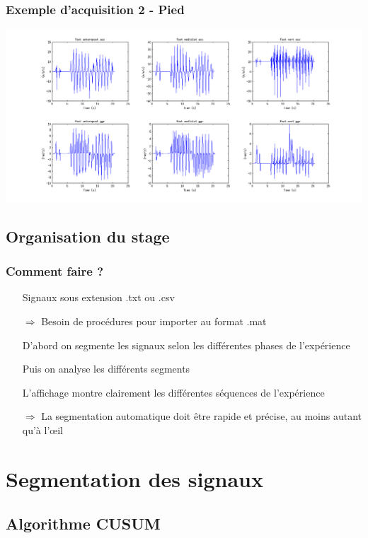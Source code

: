 \documentclass{beamer}
\begin{document}
\begin{frame}
	\frametitle{Exemple d'acquisition 2 - Pied}

			\hspace*{-2.75cm}\includegraphics[scale=0.4]{errorexamplevisufoot}

\end{frame}
\subsection{Organisation du stage}

\begin{frame}
	\frametitle{Comment faire ?}
	\begin{itemize}
		\item[Signaux] sous extension .txt ou .csv
		\item[$\Longrightarrow$] Besoin de procédures pour importer au format .mat
		\vspace*{0.5cm}
		\item[D'abord] on segmente les signaux selon les différentes phases de l'expérience
		\item[Puis] on analyse les différents segments
		\vspace*{0.5cm}
		\item[L'affichage] montre clairement les différentes séquences de l'expérience
		\item[$\Longrightarrow$] La segmentation automatique doit être rapide et précise, au moins autant qu'à l'œil
	\end{itemize}
\end{frame}

\section{Segmentation des signaux}


\subsection{Algorithme CUSUM}
\end{document}
